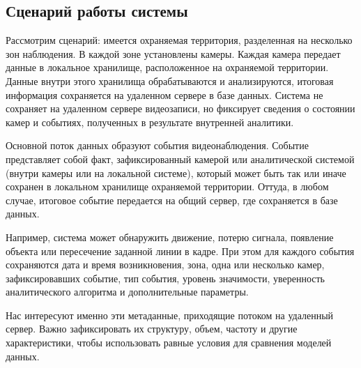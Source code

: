 \subsection{Сценарий работы системы}

Рассмотрим сценарий: имеется охраняемая территория, разделенная на
несколько зон наблюдения. В каждой зоне установлены камеры. Каждая камера
передает данные в локальное хранилище, расположенное на охраняемой территории.
Данные внутри этого хранилища обрабатываются и анализируются, итоговая информация
сохраняется на удаленном сервере в базе данных.
Система не сохраняет на удаленном сервере видеозаписи, но
фиксирует сведения о состоянии камер и событиях,
полученных в результате внутренней аналитики.

Основной поток данных образуют события видеонаблюдения. Событие представляет
собой факт, зафиксированный камерой или аналитической системой
(внутри камеры или на локальной системе), который может быть так или иначе
сохранен в локальном хранилище охраняемой территории.
Оттуда, в любом случае, итоговое событие передается на общий сервер, где
сохраняется в базе данных.

Например, система может обнаружить движение, потерю сигнала, появление объекта
или пересечение заданной линии в кадре. При этом для каждого события
сохраняются дата и время возникновения, зона, одна или несколько камер,
зафиксировавших событие, тип события, уровень значимости, уверенность
аналитического алгоритма и дополнительные параметры.

Нас интересуют именно эти метаданные, приходящие потоком на удаленный сервер.
Важно зафиксировать их структуру, объем, частоту и другие характеристики,
чтобы использовать равные условия для сравнения моделей данных.

